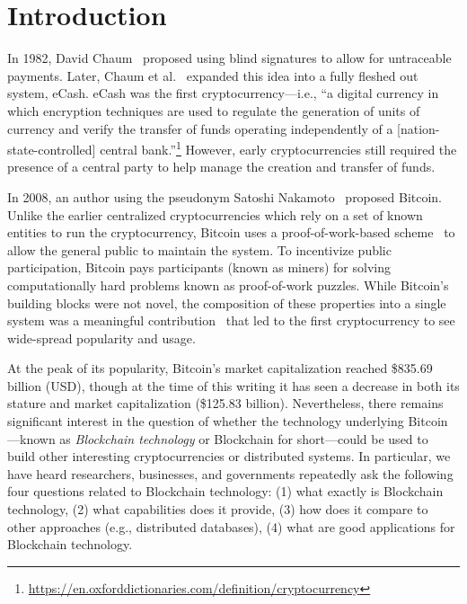 
\section{Introduction}
In 1982, David Chaum~\cite{Cha82} proposed using blind signatures to allow for untraceable payments.
Later, Chaum et al.~\cite{chaum1988untraceable} expanded this idea into a fully fleshed out system, eCash.
eCash was the first cryptocurrency---i.e., ``a digital currency in which encryption techniques are used to regulate the generation of units of currency and verify the transfer of funds operating independently of a [nation-state-controlled] central bank.''\footnote{\url{https://en.oxforddictionaries.com/definition/cryptocurrency}}
However, early cryptocurrencies still required the presence of a central party to help manage the creation and transfer of funds.

In 2008, an author using the pseudonym Satoshi Nakamoto~\cite{Nak08} proposed Bitcoin.
Unlike the earlier centralized cryptocurrencies which rely on a set of known entities to run the cryptocurrency, Bitcoin uses a proof-of-work-based scheme~\cite{DN93,back1997partial} to allow the general public to maintain the system.
To incentivize public participation, Bitcoin pays participants (known as miners) for solving computationally hard problems known as proof-of-work puzzles.
While Bitcoin's building blocks were not novel, the composition of these properties into a single system was a meaningful contribution~\cite{Narayanan17} that led to the first cryptocurrency to see wide-spread popularity and usage.

At the peak of its popularity, Bitcoin's market capitalization reached \$835.69 billion (USD), though at the time of this writing it has seen a decrease in both its stature and market capitalization (\$125.83 billion).
Nevertheless, there remains significant interest in the question of whether the technology underlying Bitcoin---known as \emph{Blockchain technology} or {Blockchain} for short---could be used to build other interesting cryptocurrencies or distributed systems.
In particular, we have heard researchers, businesses, and governments repeatedly ask the following four questions related to Blockchain technology: (1) what exactly is Blockchain technology, (2) what capabilities does it provide, (3) how does it compare to other approaches (e.g., distributed databases), (4) what are good applications for Blockchain technology.

